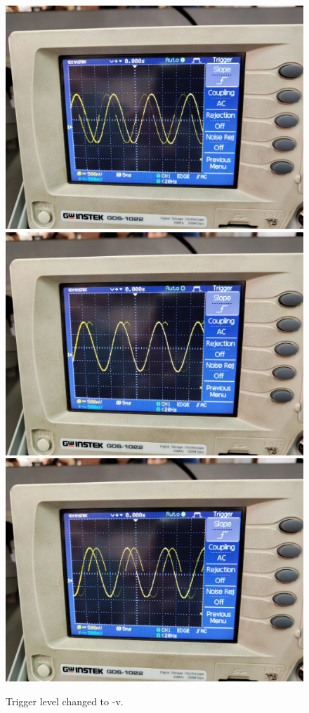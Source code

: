 \documentclass[11pt]{article}
\begin{document}
\begin{question}
{        \begin{figure}[H]
            \begin{center}
                \includegraphics[scale=0.1]{Fig/49.jpeg}
                \includegraphics[scale=0.1]{Fig/50.jpeg}
                \includegraphics[scale=0.1]{Fig/51.jpeg}
                \caption{Trigger level changed to -v.}
            \end{center}
        \end{figure}
        
}
\end{question}
\end{document}
